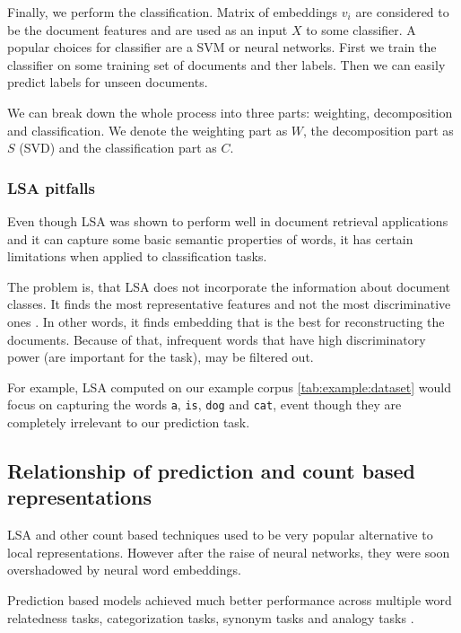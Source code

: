     Finally, we perform the classification.
    Matrix of embeddings $v_i$ are considered to be the document features and are used as an input $X$ to some classifier. 
    A popular choices for classifier are a SVM or neural networks.
    First we train the classifier on some training set of documents and ther labels.
    Then we can easily predict labels for unseen documents.
    
    We can break down the whole process into three parts: weighting, decomposition and classification.
    We denote the weighting part as $W$, the decomposition part as $S$ (SVD) and the classification part as $C$.
    
    \subsubsection{LSA pitfalls}

    Even though LSA was shown to perform well in document retrieval applications and it can capture some basic semantic properties of words,
    it has certain limitations when applied to classification tasks. 
    
    The problem is, that LSA does not incorporate the information about document classes. 
    It finds the most representative features and not the most discriminative ones \cite{berry1995using}.
    In other words, it finds embedding that is the best for reconstructing the documents.
    Because of that, infrequent words that have high discriminatory power (are important for the task), may be filtered out.
    
    For example, LSA computed on our example corpus \ref{tab:example:dataset} would focus on capturing the words \texttt{a}, \texttt{is}, \texttt{dog} and \texttt{cat},
    event though they are completely irrelevant to our prediction task.
    
    \subsection{Relationship of prediction and count based representations}
        
    LSA and other count based techniques used to be very popular alternative to local representations.
    However after the raise of neural networks, they were soon overshadowed by neural word embeddings.
    
    Prediction based models achieved much better performance across multiple word relatedness tasks, categorization tasks, synonym tasks and analogy tasks \cite{baroni2014don}. %
    
